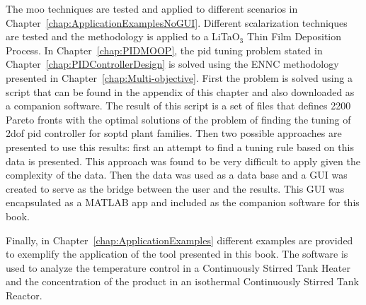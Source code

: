 The \gls{moo} techniques are tested and applied to different scenarios in Chapter~\ref{chap:ApplicationExamplesNoGUI}. Different scalarization techniques are tested and the methodology is applied to a LiTaO$_3$ Thin Film Deposition Process. In Chapter~\ref{chap:PIDMOOP}, the \gls{pid} tuning problem stated in Chapter~\ref{chap:PIDControllerDesign} is solved using the ENNC methodology presented in Chapter~\ref{chap:Multi-objective}. First the problem is solved using a \matlab{} script that can be found in the appendix of this chapter and also downloaded as a companion software. The result of this script is a set of files that defines 2200 Pareto fronts with the optimal solutions of the problem of finding the tuning of \gls{2dof} \gls{pid} controller for \gls{soptd} plant families. Then two possible approaches are presented to use this results: first an attempt to find a tuning rule based on this data is presented. This approach was found to be very difficult to apply given the complexity of the data. Then the data was used as a data base and a GUI was created to serve as the bridge between the user and the results. This GUI was encapsulated as a MATLAB app and included as the companion software for this book.

Finally, in Chapter~\ref{chap:ApplicationExamples} different examples are provided to exemplify the application of the tool presented in this book. The software is used to analyze the temperature control in a Continuously Stirred Tank Heater and the concentration of the product in an isothermal Continuously Stirred Tank Reactor.



